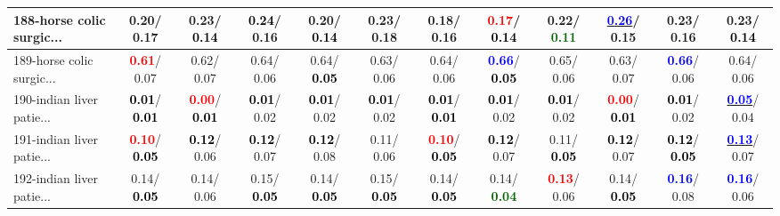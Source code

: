 \begin{table}[h]
\begin{center}
{\begin{tabular}{lc|c|c|c|c|c|c|c|c|c|c}
188-horse colic surgic... &   0.20/  0.17 &   0.23/\textcolor{black}{\textbf{  0.14}} & \textcolor{black}{\textbf{  0.24}}/  0.16 &   0.20/\textcolor{black}{\textbf{  0.14}} &   0.23/  0.18 &   0.18/  0.16 & \textcolor{red}{\textbf{  0.17}}/\textcolor{black}{\textbf{  0.14}} &   0.22/\textcolor{darkgreen}{\textbf{  0.11}} & \underline{\textcolor{blue}{\textbf{  0.26}}}/  0.15 &   0.23/  0.16 &   0.23/\textcolor{black}{\textbf{  0.14}} \\ \hline
189-horse colic surgic... & \textcolor{red}{\textbf{  0.61}}/  0.07 &   0.62/  0.07 &   0.64/  0.06 &   0.64/\textcolor{black}{\textbf{  0.05}} &   0.63/  0.06 &   0.64/  0.06 & \textcolor{blue}{\textbf{  0.66}}/\textcolor{black}{\textbf{  0.05}} &   0.65/  0.06 &   0.63/  0.07 & \textcolor{blue}{\textbf{  0.66}}/  0.06 &   0.64/  0.06 \\
190-indian liver patie... & \textcolor{black}{\textbf{  0.01}}/\textcolor{black}{\textbf{  0.01}} & \textcolor{red}{\textbf{  0.00}}/\textcolor{black}{\textbf{  0.01}} & \textcolor{black}{\textbf{  0.01}}/  0.02 & \textcolor{black}{\textbf{  0.01}}/  0.02 & \textcolor{black}{\textbf{  0.01}}/  0.02 & \textcolor{black}{\textbf{  0.01}}/\textcolor{black}{\textbf{  0.01}} & \textcolor{black}{\textbf{  0.01}}/  0.02 & \textcolor{black}{\textbf{  0.01}}/  0.02 & \textcolor{red}{\textbf{  0.00}}/\textcolor{black}{\textbf{  0.01}} & \textcolor{black}{\textbf{  0.01}}/  0.02 & \underline{\textcolor{blue}{\textbf{  0.05}}}/  0.04 \\
191-indian liver patie... & \textcolor{red}{\textbf{  0.10}}/\textcolor{black}{\textbf{  0.05}} & \textcolor{black}{\textbf{  0.12}}/  0.06 & \textcolor{black}{\textbf{  0.12}}/  0.07 & \textcolor{black}{\textbf{  0.12}}/  0.08 &   0.11/  0.06 & \textcolor{red}{\textbf{  0.10}}/\textcolor{black}{\textbf{  0.05}} & \textcolor{black}{\textbf{  0.12}}/  0.07 &   0.11/\textcolor{black}{\textbf{  0.05}} & \textcolor{black}{\textbf{  0.12}}/  0.07 & \textcolor{black}{\textbf{  0.12}}/\textcolor{black}{\textbf{  0.05}} & \underline{\textcolor{blue}{\textbf{  0.13}}}/  0.07 \\
192-indian liver patie... &   0.14/\textcolor{black}{\textbf{  0.05}} &   0.14/  0.06 &   0.15/\textcolor{black}{\textbf{  0.05}} &   0.14/\textcolor{black}{\textbf{  0.05}} &   0.15/\textcolor{black}{\textbf{  0.05}} &   0.14/\textcolor{black}{\textbf{  0.05}} &   0.14/\textcolor{darkgreen}{\textbf{  0.04}} & \textcolor{red}{\textbf{  0.13}}/  0.06 &   0.14/\textcolor{black}{\textbf{  0.05}} & \textcolor{blue}{\textbf{  0.16}}/  0.08 & \textcolor{blue}{\textbf{  0.16}}/  0.06 \\\end{tabular}}\label{stratsALCKappa5AllReduxa}
\end{center}
\end{table}
